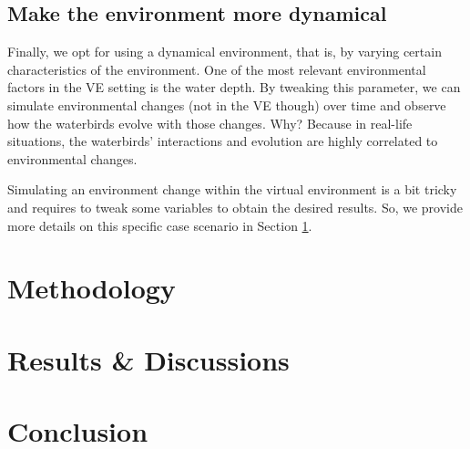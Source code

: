 \subsection{Make the environment more dynamical}
Finally, we opt for using a dynamical environment, that is, by varying certain characteristics of the environment. One of the most relevant environmental factors in the VE setting is the water depth. By tweaking this parameter, we can simulate environmental changes (not in the VE though) over time and observe how the waterbirds evolve with those changes. Why? Because in real-life situations, the waterbirds' interactions and evolution are highly correlated to environmental changes.

Simulating an environment change within the virtual environment is a bit tricky and requires to tweak some variables to obtain the desired results. So, we provide more details on this specific case scenario in Section \ref{sec:methodology}.


\section{Methodology}\label{sec:methodology}

\section{Results \& Discussions}

\section{Conclusion}
